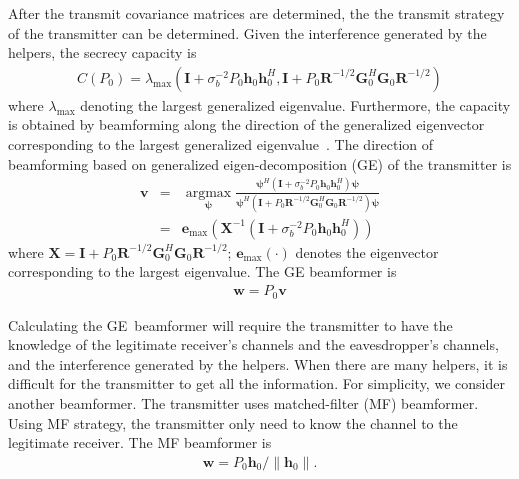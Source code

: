 \documentclass[journal]{IEEEtran}
\begin{document}
After the transmit covariance matrices are determined, the the transmit strategy of the transmitter can be determined. Given the interference generated  by the helpers, the secrecy capacity is 
\begin{eqnarray}
C(P_0) = \lambda_{\text{max}}\left(\mathbf{I} + \sigma_b^{-2}P_0\mathbf{h}_0\mathbf{h}_0^H,\mathbf{I} + P_0\mathbf{R}^{-1/2}\mathbf{G}_0^H\mathbf{G}_0\mathbf{R}^{-1/2}\right)
\end{eqnarray}
where $\lambda_{\text{max}}$ denoting the largest generalized eigenvalue. Furthermore, the capacity is obtained by beamforming along the direction of the generalized eigenvector corresponding to the largest generalized eigenvalue~\cite{khisti_secure_2010}. The direction of beamforming based on generalized eigen-decomposition (GE) of the transmitter is
\begin{eqnarray}
\mathbf{v} &=& \underset{\boldsymbol{\psi}}{\operatorname{argmax}}\frac{\boldsymbol{\psi}^H\left(\mathbf{I} + \sigma_b^{-2}P_0\mathbf{h}_0\mathbf{h}_0^H\right)\boldsymbol{\psi}}{\boldsymbol{\psi}^H\left(\mathbf{I} + P_0\mathbf{R}^{-1/2}\mathbf{G}_0^H\mathbf{G}_0\mathbf{R}^{-1/2}\right)\boldsymbol{\psi}} \\
&=&\mathbf{e}_{\text{max}}\left(\mathbf{X}^{-1}\left(\mathbf{I} + \sigma_b^{-2}P_0\mathbf{h}_0\mathbf{h}_0^H\right)\right) \label{eq:GE direction}
\end{eqnarray}
where $\mathbf{X} = \mathbf{I} + P_0\mathbf{R}^{-1/2}\mathbf{G}_0^H\mathbf{G}_0\mathbf{R}^{-1/2}$; $\mathbf{e}_{\text{max}}(\cdot)$ denotes the eigenvector corresponding to the largest eigenvalue.
The GE beamformer is 
\begin{eqnarray}
\mathbf{w} = P_0\mathbf{v}
\end{eqnarray} 

Calculating the GE~beamformer will require the transmitter to have the knowledge of the legitimate
receiver's channels and the eavesdropper's channels, and the interference generated by the helpers. When there are many helpers, it is difficult for the transmitter to get all the information.  For simplicity, we consider another beamformer. The transmitter uses matched-filter (MF) beamformer. Using MF strategy, the transmitter only need to know the channel to the legitimate receiver. The MF beamformer is
\begin{eqnarray}
\mathbf{w} = P_0\mathbf{h}_0/\|\mathbf{h}_0\|.
\end{eqnarray}
\end{document}
